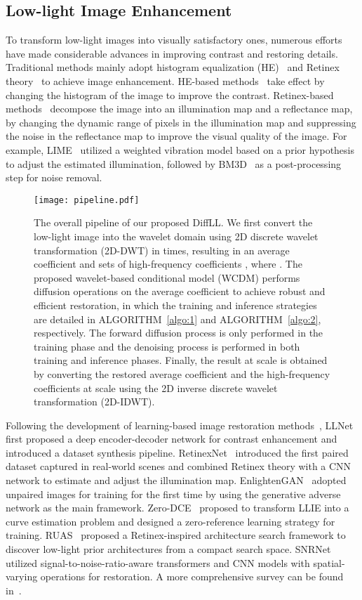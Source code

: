 \subsection{Low-light Image Enhancement}
To transform low-light images into visually satisfactory ones, numerous efforts have made considerable advances in improving contrast and restoring details. Traditional methods mainly adopt histogram equalization (HE)~\cite{HE} and Retinex theory~\cite{Retinex} to achieve image enhancement. HE-based methods~\cite{HE1,HE2,HE3} take effect by changing the histogram of the image to improve the contrast. Retinex-based methods~\cite{Retinex_based1,SRIE,Retinex_based2} decompose the image into an illumination map and a reflectance map, by changing the dynamic range of pixels in the illumination map and suppressing the noise in the reflectance map to improve the visual quality of the image. For example, LIME~\cite{LIME} utilized a weighted vibration model based on a prior hypothesis to adjust the estimated illumination, followed by BM3D~\cite{BM3D} as a post-processing step for noise removal.
\begin{figure*}[!t]
	\centering
	\texttt{[image: pipeline.pdf]}
	\caption{The overall pipeline of our proposed DiffLL. We first convert the low-light image into the wavelet domain using 2D discrete wavelet transformation (2D-DWT) in  times, resulting in an average coefficient  and  sets of high-frequency coefficients , where . The proposed wavelet-based conditional model (WCDM) performs diffusion operations on the average coefficient to achieve robust and efficient restoration, in which the training and inference strategies are detailed in ALGORITHM~\ref{algo:1} and ALGORITHM~\ref{algo:2}, respectively. The forward diffusion process is only performed in the training phase and the denoising process is performed in both training and inference phases. Finally, the result at scale  is obtained by converting the restored average coefficient and the high-frequency coefficients at scale  using the 2D inverse discrete wavelet transformation (2D-IDWT).}
	\label{fig:pipeline}
\end{figure*}

Following the development of learning-based image restoration methods~\cite{restoration1,restoration2,restoration3}, LLNet~\cite{LLNet} first proposed a deep encoder-decoder network for contrast enhancement and introduced a dataset synthesis pipeline. RetinexNet~\cite{RetinexNet} introduced the first paired dataset captured in real-world scenes and combined Retinex theory with a CNN network to estimate and adjust the illumination map. EnlightenGAN~\cite{EnlightenGAN} adopted unpaired images for training for the first time by using the generative adverse network as the main framework. Zero-DCE~\cite{Zero-DCE} proposed to transform LLIE into a curve estimation problem and designed a zero-reference learning strategy for training. RUAS~\cite{RUAS} proposed a Retinex-inspired architecture search framework to discover low-light prior architectures from a compact search space. SNRNet~\cite{SNRNet} utilized signal-to-noise-ratio-aware transformers and CNN models with spatial-varying operations for restoration. A more comprehensive survey can be found in~\cite{survey}.

